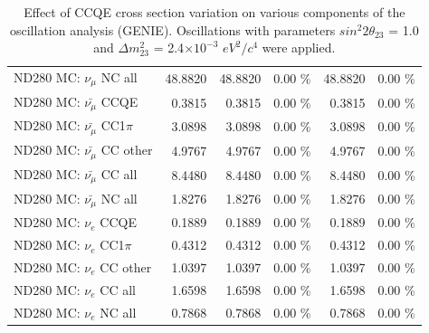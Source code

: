 \begin{table}
\begin{tabular}{| l | r | r  r | r  r |}
                                          ND280 MC: $\nu_{\mu}$ NC all &         48.8820 &         48.8820 &  0.00 \%  &         48.8820 &  0.00 \%  \\ 
                                      ND280 MC: $\bar{\nu_{\mu}}$ CCQE &          0.3815 &          0.3815 &  0.00 \%  &          0.3815 &  0.00 \%  \\ 
                                  ND280 MC: $\bar{\nu_{\mu}}$ CC1$\pi$ &          3.0898 &          3.0898 &  0.00 \%  &          3.0898 &  0.00 \%  \\ 
                                  ND280 MC: $\bar{\nu_{\mu}}$ CC other &          4.9767 &          4.9767 &  0.00 \%  &          4.9767 &  0.00 \%  \\ 
                                    ND280 MC: $\bar{\nu_{\mu}}$ CC all &          8.4480 &          8.4480 &  0.00 \%  &          8.4480 &  0.00 \%  \\ 
                                    ND280 MC: $\bar{\nu_{\mu}}$ NC all &          1.8276 &          1.8276 &  0.00 \%  &          1.8276 &  0.00 \%  \\ 
                                              ND280 MC: $\nu_{e}$ CCQE &          0.1889 &          0.1889 &  0.00 \%  &          0.1889 &  0.00 \%  \\ 
                                          ND280 MC: $\nu_{e}$ CC1$\pi$ &          0.4312 &          0.4312 &  0.00 \%  &          0.4312 &  0.00 \%  \\ 
                                          ND280 MC: $\nu_{e}$ CC other &          1.0397 &          1.0397 &  0.00 \%  &          1.0397 &  0.00 \%  \\ 
                                            ND280 MC: $\nu_{e}$ CC all &          1.6598 &          1.6598 &  0.00 \%  &          1.6598 &  0.00 \%  \\ 
                                            ND280 MC: $\nu_{e}$ NC all &          0.7868 &          0.7868 &  0.00 \%  &          0.7868 &  0.00 \%  \\ 
\hline
\end{tabular}
\caption{ 
  Effect of CCQE cross section variation
  on various components of the oscillation analysis (GENIE).
  Oscillations with parameters $sin^{2}2\theta_{23}$ = 1.0 and $\Delta m^{2}_{23}$ = 2.4$\times10^{-3}$ $eV^{2}/c^{4}$ were applied.  
}
\label{tab:genie_xsec_ccqe}
\end{table}


%
%
%
%


